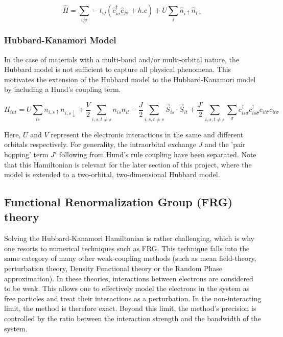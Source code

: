 \documentclass[12pt]{article}
\begin{document}
\begin{equation}\label{t Hubbard model}
    \hat{H} = \sum_{ij\sigma} -t_{ij}(\hat{c}_{i\sigma}^{\dagger}\hat{c}_{j \sigma} + h.c) 
    + U \sum_{i} \hat{n}_{i \uparrow} \hat{n}_{i \downarrow}
\end{equation}





\subsubsection{Hubbard-Kanamori Model}
\label{subsubsec: HKmodel}
In the case of materials with a multi-band and/or multi-orbital nature, the Hubbard model is not sufficient to capture all physical phenomena. This motivates the extension of the Hubbard model to the Hubbard-Kanamori model\cite{sherman2020hubbard} by including a Hund's coupling term.

\begin{equation} \label{Hubbard-Kanamori Model}
    H_{int} = U \sum_{is}n_{i,s\uparrow}n_{i,s\downarrow} + \frac{V}{2} \sum_{i,s,t \neq s} n_{is}n_{it} -\frac{J}{2} \sum_{i,s,t \neq s} \vec{S}_{is} \cdot \vec{S}_{it} 
    + \frac{J'}{2} \sum_{i,s,t \neq s} \sum_{\sigma} c_{is\sigma}^{\dagger}c_{is\bar{\sigma}}^{\dagger}c_{it\bar{\sigma}}c_{it\sigma}
\end{equation}

\noindent Here, $U$ and $V$ represent the electronic interactions in the same and different orbitals respectively. For generality, the intraorbital exchange $J$ and the 'pair hopping' term $J'$ following from Hund's rule coupling have been separated.  
Note that this Hamiltonian is relevant for the later section of this project, where the model is extended to a two-orbital, two-dimensional Hubbard model.

\subsection{Functional Renormalization Group (FRG) theory}

Solving the Hubbard-Kanamori Hamiltonian is rather challenging, which is why one resorts to numerical techniques such as FRG. This technique falls into the same category of many other weak-coupling methods (such as mean field-theory\cite{kadanoff2009more}, perturbation theory\cite{nagaosa2013quantum}, Density Functional theory\cite{kohn1965self} or the Random Phase approximation\cite{bohm1951collective}).
In these theories, interactions between electrons are considered to be weak. This allows one to effectively model the electrons in the system as free particles 
and treat their interactions as a perturbation. In the non-interacting limit, the method is therefore exact. Beyond this limit, the method's precision is controlled by the ratio between the interaction
strength and the bandwidth of the system. \par
\end{document}
